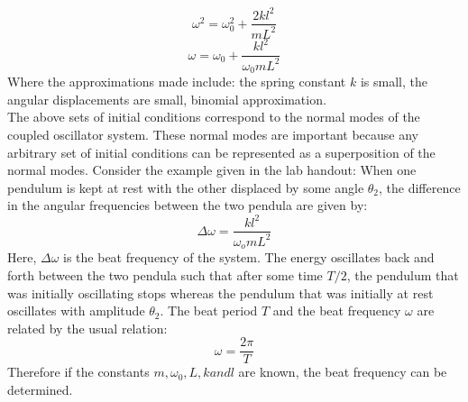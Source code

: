 \documentclass[main.tex]{subfiles}
\begin{document}
\begin{equation}
\omega^2 = \omega_0^2 + \frac{2kl^2}{mL^2}
\end{equation}
\begin{equation}
\omega = \omega_0 + \frac{kl^2}{\omega_0 mL^2}
\end{equation}
Where the approximations made include: the spring constant $k$ is small, the angular displacements are small, binomial approximation.
\\
The above sets of initial conditions correspond to the normal modes of the coupled oscillator system. These normal modes are important because any arbitrary set of initial conditions can be represented as a superposition of the normal modes. Consider the example given in the lab handout: When one pendulum is kept at rest with the other displaced by some angle $\theta_2$, the difference in the angular frequencies between the two pendula are given by:
\begin{equation}
\Delta\omega = \frac{kl^2}{\omega_o mL^2}
\end{equation}
Here, $\Delta\omega$ is the beat frequency of the system. The energy oscillates back and forth between the two pendula such that after some time $T/2$, the pendulum that was initially oscillating stops whereas the pendulum that was initially at rest oscillates with amplitude $\theta_2$. The beat period $T$ and the beat frequency $\omega$ are related by the usual relation:
\begin{equation}
\omega = \frac{2\pi}{T}
\end{equation}
Therefore if the constants $m, \omega_0, L, k and l$ are known, the beat frequency can be determined.
\end{document}
